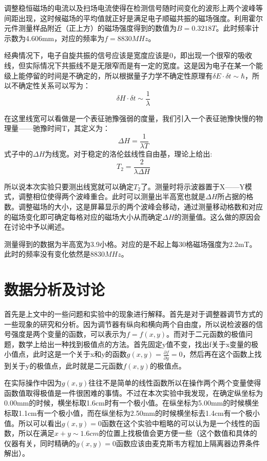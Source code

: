 \documentclass[aps,pre,12pt,preprint,onecolumn,showpacs,showkeys,UTF8]{revtex4-1}
\begin{document}
调整稳恒磁场的电流以及扫场电流使得在检测信号随时间变化的波形上两个波峰等间距出现，这时候磁场的平均值就正好是满足电子顺磁共振的磁场强度。利用霍尔元件测量样品附近（正上方）的磁场强度得到的数值为$B=0.3218T$。此时频率计示数为4.606mm，对应的频率为$f=8830MHz$。

经典情况下，电子自旋共振的信号应该是宽度应该是0，即出现一个很窄的吸收线，但实际情况下共振线不是无限窄而是有一定的宽度。这是因为电子在某一个能级上能停留的时间是不确定的，所以根据量子力学不确定性原理有$\delta E \cdot \delta t \sim \hbar$，所以不确定性关系可以写为：
\begin{equation}
	\delta H \cdot \delta t \sim \frac{1}{\lambda}
\end{equation}

在这里线宽可以看做是一个表征驰豫强弱的度量，我们引入一个表征驰豫快慢的物理量——驰豫时间T，其定义为：
$$\Delta H =\frac{1}{\lambda T}$$
式子中的$\Delta H$为线宽。对于稳定的洛伦兹线性自由基，理论上给出:
\begin{equation}
	T_2=\frac{2}{\lambda \Delta H}
\end{equation}

所以说本次实验只要测出线宽就可以确定$T_2$了。测量时将示波器置于X——Y模式，调整相位使得两个波峰重合。此时可以测量出半高宽也就是$\Delta H$所占据的格数。调整磁场的大小，这是屏幕显示的两个波峰会移动，通过测量移动格数和对应的磁场变化即可确定每格对应的磁场大小从而确定$\Delta H$的测量值。这么做的原因会在讨论中予以阐述。

测量得到的数据为半高宽为3.9小格。对应的是不起上每30格磁场强度为2.2mT。此时的频率没有变化依然是$8830MHz$。

\section{数据分析及讨论}

首先是上文中的一些问题和实验中的现象进行解释。首先是对于调整器调节方式的一些现象的研究和分析。因为调节器有纵向和横向两个自由度，所以说检波器的信号强度是两个变量的函数，可以表示为$f=f(x,y)$。而对于二元函数的极值问题，数学上给出一种找到极值点的方法。首先固定y值不变，找出f关于x变量的极小值点，此时这是一个关于x和y的函数$g(x,y)=\frac{\partial f}{\partial y}=0$，然后再在这个函数上找到关于y的极值点，此时就是二元函数$f(x,y)$的极值点。

在实际操作中因为$g(x,y)$往往不是简单的线性函数所以在操作两个两个变量使得函数值取得极值是一件很困难的事情。不过在本次实验中我发现，在确定纵坐标为0.00mm的时候，横坐标取1.6cm时有一个极小值。在纵坐标为5.00mm的时候横坐标取1.1cm有一个极小值，而在纵坐标为2.50mm的时候横坐标去1.4cm有一个极小值。所以可以看出$g(x,y)=0$函数在这个实验中粗略的可以认为是一个线性的函数，所以在满足$x+y\sim 1.6cm$的位置上找极值会更方便一些（这个数值和具体的仪器有关，同时精确的$g(x,y)=0$函数应该由麦克斯韦方程加上隔离器边界条件解出）。
\end{document}
